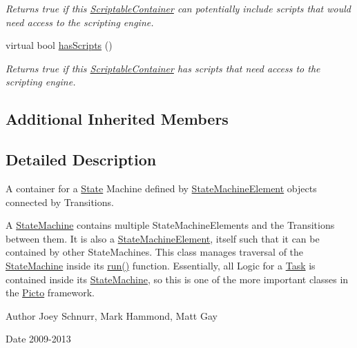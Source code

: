 \begin{DoxyCompactItemize}
\begin{DoxyCompactList}\small\item\em Returns true if this \hyperlink{class_picto_1_1_scriptable_container}{Scriptable\-Container} can potentially include scripts that would need access to the scripting engine. \end{DoxyCompactList}\item 
virtual bool \hyperlink{class_picto_1_1_state_machine_adc8ccc0e0a7c8ab66fb33485b1a3cc30}{has\-Scripts} ()
\begin{DoxyCompactList}\small\item\em Returns true if this \hyperlink{class_picto_1_1_scriptable_container}{Scriptable\-Container} has scripts that need access to the scripting engine. \end{DoxyCompactList}\end{DoxyCompactItemize}
\subsection*{Additional Inherited Members}


\subsection{Detailed Description}
A container for a \hyperlink{class_picto_1_1_state}{State} Machine defined by \hyperlink{class_picto_1_1_state_machine_element}{State\-Machine\-Element} objects connected by Transitions. 

A \hyperlink{class_picto_1_1_state_machine}{State\-Machine} contains multiple State\-Machine\-Elements and the Transitions between them. It is also a \hyperlink{class_picto_1_1_state_machine_element}{State\-Machine\-Element}, itself such that it can be contained by other State\-Machines. This class manages traversal of the \hyperlink{class_picto_1_1_state_machine}{State\-Machine} inside its \hyperlink{class_picto_1_1_state_machine_ae627a569715e852af85cff71d5e64e1e}{run()} function. Essentially, all Logic for a \hyperlink{class_picto_1_1_task}{Task} is contained inside its \hyperlink{class_picto_1_1_state_machine}{State\-Machine}, so this is one of the more important classes in the \hyperlink{namespace_picto}{Picto} framework. \begin{DoxyAuthor}{Author}
Joey Schnurr, Mark Hammond, Matt Gay 
\end{DoxyAuthor}
\begin{DoxyDate}{Date}
2009-\/2013 
\end{DoxyDate}


